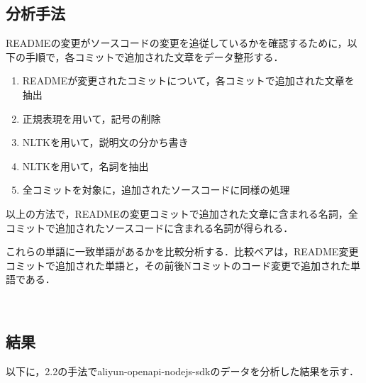 \documentclass[uplatex,dvipdfmx,a4paper,twocolumn,base=11pt,jbase=11pt,ja=standard]{bxjsarticle}  %
\begin{document}
\subsection{分析手法}


READMEの変更がソースコードの変更を追従しているかを確認するために，以下の手順で，各コミットで追加された文章をデータ整形する．

\vspace{-2mm}
\begin{enumerate}
    \item READMEが変更されたコミットについて，各コミットで追加された文章を抽出
    \item 正規表現を用いて，記号の削除
    \item NLTKを用いて，説明文の分かち書き
    \item NLTKを用いて，名詞を抽出
    \item 全コミットを対象に，追加されたソースコードに同様の処理
\end{enumerate}

以上の方法で，READMEの変更コミットで追加された文章に含まれる名詞，全コミットで追加されたソースコードに含まれる名詞が得られる．

これらの単語に一致単語があるかを比較分析する．比較ペアは，README変更コミットで追加された単語と，その前後Nコミットのコード変更で追加された単語である．



\subsection{結果}


以下に，2.2の手法でaliyun-openapi-nodejs-sdkのデータを分析した結果を示す．
\end{document}
